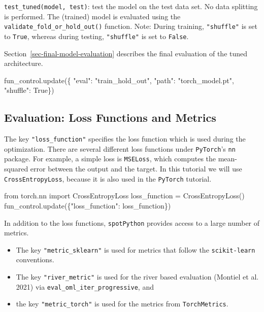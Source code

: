 \documentclass[
  letterpaper,
  DIV=11,
  numbers=noendperiod]{scrreprt}
\newenvironment{Shaded}{\begin{snugshade}}{\end{snugshade}}
\newcommand{\ImportTok}[1]{\textcolor[rgb]{0.00,0.46,0.62}{#1}}
\newcommand{\NormalTok}[1]{\textcolor[rgb]{0.00,0.23,0.31}{#1}}
\newcommand{\OperatorTok}[1]{\textcolor[rgb]{0.37,0.37,0.37}{#1}}
\newcommand{\StringTok}[1]{\textcolor[rgb]{0.13,0.47,0.30}{#1}}
\newcommand{\VariableTok}[1]{\textcolor[rgb]{0.07,0.07,0.07}{#1}}
\providecommand{\tightlist}{%
  \setlength{\itemsep}{0pt}\setlength{\parskip}{0pt}}\usepackage{longtable,booktabs,array}
\begin{document}
\texttt{test\_tuned(model,\ test)}: test the model on the test data set.
No data splitting is performed. The (trained) model is evaluated using
the \texttt{validate\_fold\_or\_hold\_out()} function. Note: During
training, \texttt{"shuffle"} is set to \texttt{True}, whereas during
testing, \texttt{"shuffle"} is set to \texttt{False}.

Section~\ref{sec-final-model-evaluation} describes the final evaluation
of the tuned architecture.

\begin{Shaded}
\begin{Highlighting}[]
\NormalTok{fun\_control.update(\{}
    \StringTok{"eval"}\NormalTok{: }\StringTok{"train\_hold\_out"}\NormalTok{,}
    \StringTok{"path"}\NormalTok{: }\StringTok{"torch\_model.pt"}\NormalTok{,}
    \StringTok{"shuffle"}\NormalTok{: }\VariableTok{True}\NormalTok{\})}
\end{Highlighting}
\end{Shaded}

\hypertarget{sec-loss-functions-14}{%
\subsection{Evaluation: Loss Functions and
Metrics}\label{sec-loss-functions-14}}

The key \texttt{"loss\_function"} specifies the loss function which is
used during the optimization. There are several different loss functions
under \texttt{PyTorch}'s \texttt{nn} package. For example, a simple loss
is \texttt{MSELoss}, which computes the mean-squared error between the
output and the target. In this tutorial we will use
\texttt{CrossEntropyLoss}, because it is also used in the
\texttt{PyTorch} tutorial.

\begin{Shaded}
\begin{Highlighting}[]
\ImportTok{from}\NormalTok{ torch.nn }\ImportTok{import}\NormalTok{ CrossEntropyLoss}
\NormalTok{loss\_function }\OperatorTok{=}\NormalTok{ CrossEntropyLoss()}
\NormalTok{fun\_control.update(\{}\StringTok{"loss\_function"}\NormalTok{: loss\_function\})}
\end{Highlighting}
\end{Shaded}

In addition to the loss functions, \texttt{spotPython} provides access
to a large number of metrics.

\begin{itemize}
\tightlist
\item
  The key \texttt{"metric\_sklearn"} is used for metrics that follow the
  \texttt{scikit-learn} conventions.
\item
  The key \texttt{"river\_metric"} is used for the river based
  evaluation (Montiel et al. 2021) via
  \texttt{eval\_oml\_iter\_progressive}, and
\item
  the key \texttt{"metric\_torch"} is used for the metrics from
  \texttt{TorchMetrics}.
\end{itemize}
\end{document}
